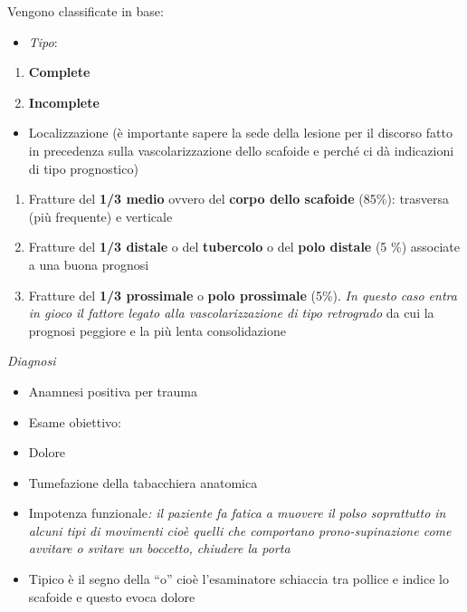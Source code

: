 \documentclass[]{article}
\begin{document}
Vengono classificate in base:

\begin{itemize}
\item
  \emph{Tipo}:
\end{itemize}

\begin{enumerate}
\def\labelenumi{\arabic{enumi}.}
\item
  \textbf{Complete }
\item
  \textbf{Incomplete }
\end{enumerate}

\begin{itemize}
\item
  Localizzazione (è importante sapere la sede della lesione per il
  discorso fatto in precedenza sulla vascolarizzazione dello scafoide e
  perché ci dà indicazioni di tipo prognostico)
\end{itemize}

\begin{enumerate}
\def\labelenumi{\arabic{enumi}.}
\item
  Fratture del \textbf{1/3 medio} ovvero del \textbf{corpo dello
  scafoide} (85\%): trasversa (più frequente) e verticale
\item
  Fratture del \textbf{1/3 distale} o del \textbf{tubercolo} o del
  \textbf{polo distale} (5 \%) associate a una buona prognosi
\item
  Fratture del \textbf{1/3 prossimale} o \textbf{polo prossimale} (5\%).
  \emph{In questo caso entra in gioco il fattore legato alla
  vascolarizzazione di tipo retrogrado} da cui la prognosi peggiore e la
  più lenta consolidazione
\end{enumerate}

\emph{Diagnosi}

\begin{itemize}
\item
  Anamnesi positiva per trauma
\item
  Esame obiettivo:
\end{itemize}

\begin{itemize}
\item
  Dolore
\item
  Tumefazione della tabacchiera anatomica
\item
  Impotenza funzionale\emph{: il paziente fa fatica a muovere il polso
  soprattutto in alcuni tipi di movimenti cioè quelli che comportano
  prono-supinazione come avvitare o svitare un boccetto, chiudere la
  porta}
\item
  Tipico è il segno della ``o'' cioè l'esaminatore schiaccia tra pollice
  e indice lo scafoide e questo evoca dolore
\end{itemize}
\end{document}
